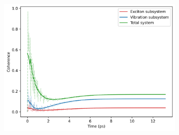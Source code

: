 \documentclass[11pt]{article}
\begin{document}
\begin{figure}[H]
    \vspace{0.5cm}
    
    \begin{subfigure}{0.45\textwidth}
        \centering
        \includegraphics[width=\linewidth]{Research Project/Code/results/ExVib/Open/Coherence/coh_both_e0.png}
        \caption{}
        \label{fig:EVM_OQS_Coh_both}
    \end{subfigure}
    \hfill

    \caption{}
    \label{fig:EVM_OQS_Coh}
\end{figure}
\end{document}
